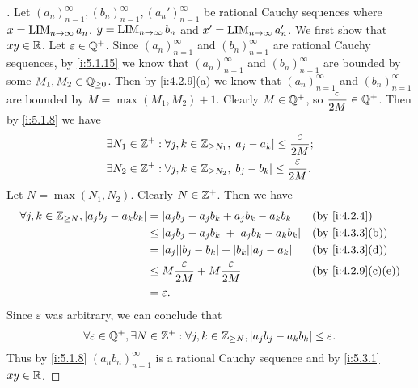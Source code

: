 \begin{proof}[]
  Let \((a_n)_{n = 1}^\infty, (b_n)_{n = 1}^\infty, (a_n')_{n = 1}^\infty\) be rational Cauchy sequences where \(x = \operatorname*{LIM}_{n \to \infty} a_n\), \(y = \operatorname*{LIM}_{n \to \infty} b_n\) and \(x' = \operatorname*{LIM}_{n \to \infty} a_n'\).
  We first show that \(xy \in \mathbb{R}\).
  Let \(\varepsilon \in \mathbb{Q}^+\).
  Since \((a_n)_{n = 1}^\infty\) and \((b_n)_{n = 1}^\infty\) are rational Cauchy sequences, by \cref{i:5.1.15} we know that \((a_n)_{n = 1}^\infty\) and \((b_n)_{n = 1}^\infty\) are bounded by some \(M_1, M_2 \in \mathbb{Q}_{\geq 0}\).
  Then by \cref{i:4.2.9}(a) we know that \((a_n)_{n = 1}^\infty\) and \((b_n)_{n = 1}^\infty\) are bounded by \(M = \max(M_1, M_2) + 1\).
  Clearly \(M \in \mathbb{Q}^+\), so \(\dfrac{\varepsilon}{2M} \in \mathbb{Q}^+\).
  Then by \cref{i:5.1.8} we have
  \begin{align*}
     & \exists N_1 \in \mathbb{Z}^+ : \forall j, k \in \mathbb{Z}_{\geq N_1}, \left\lvert a_j - a_k\right\rvert \leq \dfrac{\varepsilon}{2M}; \\
     & \exists N_2 \in \mathbb{Z}^+ : \forall j, k \in \mathbb{Z}_{\geq N_2}, \left\lvert b_j - b_k\right\rvert \leq \dfrac{\varepsilon}{2M}.
  \end{align*}
  Let \(N = \max(N_1, N_2)\).
  Clearly \(N \in \mathbb{Z}^+\).
  Then we have
  \begin{align*}
    \forall j, k \in \Z_{\geq N}, \abs{a_j b_j - a_k b_k} & = \abs{a_j b_j - a_j b_k + a_j b_k - a_k b_k}              &  & \by{i:4.2.4}      \\
                                                          & \leq \abs{a_j b_j - a_j b_k} + \abs{a_j b_k - a_k b_k}     &  & \by{i:4.3.3}[b]   \\
                                                          & = \abs{a_j} \abs{b_j - b_k} + \abs{b_k} \abs{a_j - a_k}    &  & \by{i:4.3.3}[d]   \\
                                                          & \leq M \dfrac{\varepsilon}{2M} + M \dfrac{\varepsilon}{2M} &  & \by{i:4.2.9}[c,e] \\
                                                          & = \varepsilon.
  \end{align*}
  Since \(\varepsilon\) was arbitrary, we can conclude that
  \[
    \forall \varepsilon \in \mathbb{Q}^+, \exists N \in \mathbb{Z}^+ : \forall j, k \in \mathbb{Z}_{\geq N}, \left\lvert a_j b_j - a_k b_k\right\rvert \leq \varepsilon.
  \]
  Thus by \cref{i:5.1.8} \((a_n b_n)_{n = 1}^\infty\) is a rational Cauchy sequence and by \cref{i:5.3.1} \(xy \in \mathbb{R}\).


\end{proof}
